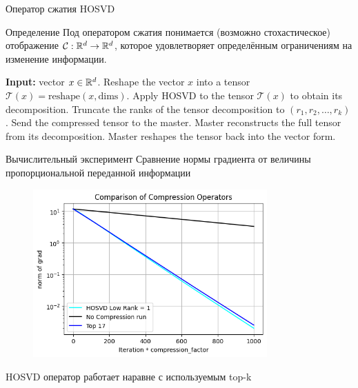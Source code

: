 \documentclass{beamer}
\begin{document}
\newcommand{\T}{\mathcal{T}}
\begin{frame}{Оператор сжатия HOSVD}

    \small
    \begin{block}{Определение}
        Под оператором сжатия понимается (возможно стохастическое) отображение $\mathcal{C} : \mathbb{R}^d \rightarrow \mathbb{R}^d$, которое удовлетворяет определённым ограничениям на изменение информации.
    \end{block}

    \begin{algorithm}[H]
        \small
        \centering
        \caption{Алгоритм сжатия данных с использованием HOSVD}
        \begin{algorithmic}[1]
            \State \textbf{Input:} vector $x \in \mathbb{R}^d$.
            \State Reshape the vector $x$ into a tensor $\T(x) = \text{reshape}(x, \text{dims})$.
            \State Apply HOSVD to the tensor $\T(x)$ to obtain its decomposition.
            \State Truncate the ranks of the tensor decomposition to $(r_1, r_2, \dots, r_k)$.
            \State Send the compressed tensor to the master.
            \State Master reconstructs the full tensor from its decomposition.
            \State Master reshapes the tensor back into the vector form.
        \end{algorithmic}        
    \end{algorithm}
\end{frame}
\begin{frame}{Вычислительный эксперимент}
\small
 Сравнение нормы градиента от величины пропорциональной переданной информации
\begin{figure}
    \centering
    
\includegraphics[width=0.8\textwidth]{../figures/hosvd.png}
\end{figure}

HOSVD оператор работает наравне с используемым top-k

\end{frame}
\end{document}
